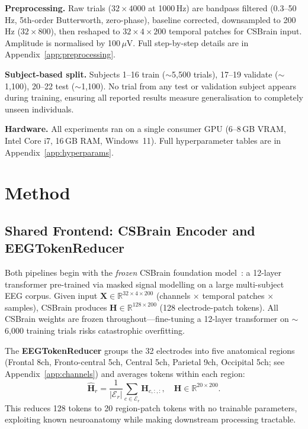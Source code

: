 \documentclass{article}
\begin{document}
\textbf{Preprocessing.} Raw trials ($32 \times 4000$ at 1000\,Hz) are bandpass filtered (0.3--50\,Hz, 5th-order Butterworth, zero-phase), baseline corrected, downsampled to 200\,Hz ($32 \times 800$), then reshaped to $32 \times 4 \times 200$ temporal patches for CSBrain input. Amplitude is normalised by 100\,$\mu$V. Full step-by-step details are in Appendix~\ref{app:preprocessing}.

\textbf{Subject-based split.} Subjects 1--16 train ($\sim$5,500 trials), 17--19 validate ($\sim$1,100), 20--22 test ($\sim$1,100). No trial from any test or validation subject appears during training, ensuring all reported results measure generalisation to completely unseen individuals.

\textbf{Hardware.} All experiments ran on a single consumer GPU (6--8\,GB VRAM, Intel Core i7, 16\,GB RAM, Windows~11). Full hyperparameter tables are in Appendix~\ref{app:hyperparams}.

\section{Method}

\subsection{Shared Frontend: CSBrain Encoder and EEGTokenReducer}

Both pipelines begin with the \emph{frozen} CSBrain foundation model~\citep{zhu2024csbrain}: a 12-layer transformer pre-trained via masked signal modelling on a large multi-subject EEG corpus. Given input $\mathbf{X}\in\mathbb{R}^{32\times4\times200}$ (channels $\times$ temporal patches $\times$ samples), CSBrain produces $\mathbf{H}\in\mathbb{R}^{128\times200}$ (128 electrode-patch tokens). All CSBrain weights are frozen throughout---fine-tuning a 12-layer transformer on $\sim$6,000 training trials risks catastrophic overfitting.

The \textbf{EEGTokenReducer} groups the 32 electrodes into five anatomical regions (Frontal 8ch, Fronto-central 5ch, Central 5ch, Parietal 9ch, Occipital 5ch; see Appendix~\ref{app:channels}) and averages tokens within each region:
\begin{equation}
  \hat{\mathbf{H}}_r = \frac{1}{|\mathcal{E}_r|} \sum_{c \in \mathcal{E}_r} \mathbf{H}_{c,:,:},
  \quad \hat{\mathbf{H}} \in \mathbb{R}^{20 \times 200}.
\end{equation}
This reduces 128 tokens to 20 region-patch tokens with no trainable parameters, exploiting known neuroanatomy while making downstream processing tractable.
\end{document}
